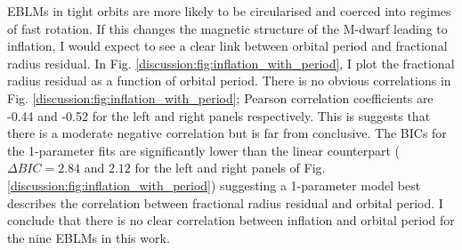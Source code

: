 EBLMs in tight orbits are more likely to be circularised and coerced into regimes of fast rotation. If this changes the magnetic structure of the M-dwarf leading to inflation, I would expect to see a clear link between orbital period and fractional radius residual. In Fig. \ref{discussion:fig:inflation_with_period}, I plot the fractional radius residual as a function of orbital period. There is no obvious correlations in Fig. \ref{discussion:fig:inflation_with_period}; Pearson correlation coefficients are -0.44 and -0.52 for the left and right panels respectively. This is suggests that there is a moderate negative correlation but is far from conclusive. The BICs for the 1-parameter fits are significantly lower than the linear counterpart ($\Delta BIC = 2.84$ and $2.12$ for the left and right panels of Fig. \ref{discussion:fig:inflation_with_period}) suggesting a 1-parameter model best describes the correlation between fractional radius residual and orbital period. I conclude that there is no clear correlation between inflation and orbital period for the nine EBLMs in this work.











